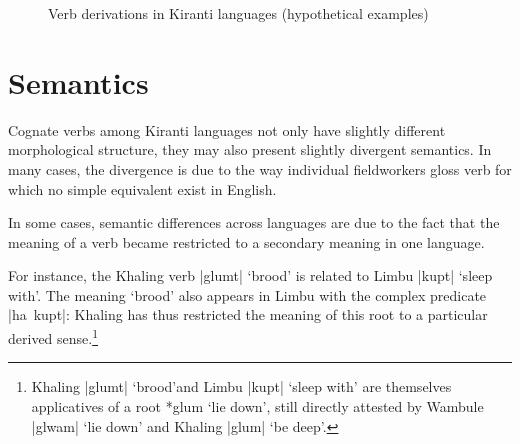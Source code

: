 \documentclass[oneside,a4paper,11pt]{article}
\newcommand{\ipa}[1]{{\phon\mbox{#1}}} %
\newcommand{\dhatu}[2]{|\ipa{#1}| `#2'}
\newcommand{\dhat}[1]{|\ipa{#1}|}
\begin{document}
   \begin{figure}[H]
   \caption{Verb derivations in Kiranti languages (hypothetical examples)} \label{fig:kiranti.derivations}  
\end{figure}

\section{Semantics} \label{sec:semantic}
Cognate verbs among Kiranti languages not only have slightly different morphological structure, they may also present slightly divergent semantics. In many cases, the divergence is due to the way individual fieldworkers gloss verb for which no simple equivalent exist in English.

In some cases, semantic differences across languages are due to the fact that the meaning of a verb became restricted to a secondary meaning in one language. 

For instance, the Khaling verb \dhatu{glumt}{brood} is related to Limbu \dhatu{kupt}{sleep with}. The meaning `brood' also appears in Limbu with the complex predicate \dhat{ha kupt}: Khaling has thus restricted the meaning of this root to a particular derived sense.\footnote{Khaling \dhatu{glumt}{brood}and Limbu  \dhatu{kupt}{sleep with} are themselves applicatives of a root \ipa{*glum} `lie down', still directly attested by Wambule  \dhatu{glwam}{lie down} and Khaling \dhatu{glum}{be deep}.  }
\end{document}

